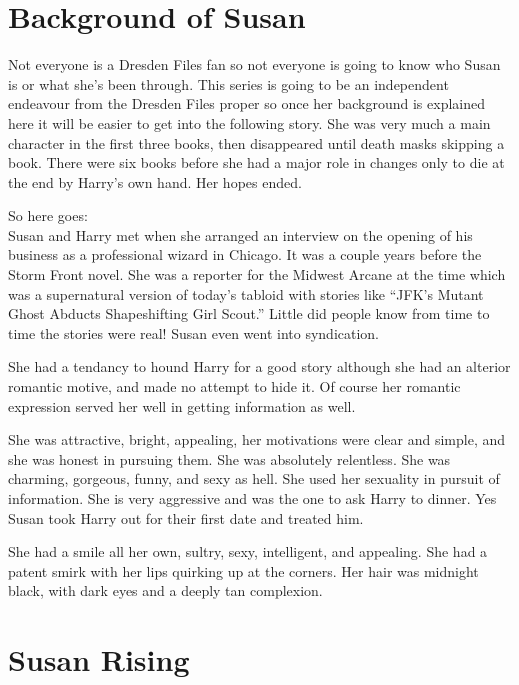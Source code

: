 \documentclass[12pt,twoside,onecolumn,openright,extrafontsizes]{memoir}
\begin{document}
\chapter*{Background of Susan}
{Not everyone is a Dresden Files fan so not everyone is going to know who Susan is or what she's been through. This series is going to be an independent endeavour from the Dresden Files proper so once her background is explained here it will be easier to get into the following story. She was very much a main character in the first three books, then disappeared until death masks skipping a book. There were six books before she had a major role in changes only to die at the end by Harry's own hand. Her hopes ended.

So here goes:\\
	\smallskip
Susan and Harry met when she arranged an interview on the opening of his business as a professional wizard in Chicago. It was a couple years before the Storm Front novel. She was a reporter for the Midwest Arcane at the time which was a supernatural version of today's tabloid with stories like ``JFK’s Mutant Ghost Abducts Shapeshifting Girl Scout.'' Little did people know from time to time the stories were real! Susan even went into syndication.

She had a tendancy to hound Harry for a good story although she had an alterior romantic motive, and made no attempt to hide it. Of course her romantic expression served her well in getting information as well.

She was attractive, bright, appealing, her motivations were clear and simple, and she was honest in pursuing them. She was absolutely relentless. She was charming, gorgeous, funny, and sexy as hell. She used her sexuality in pursuit of information. She is very aggressive and was the one to ask Harry to dinner. Yes Susan took Harry out for their first date and treated him. 

She had a smile all her own, sultry, sexy, intelligent, and appealing. She had a patent smirk with her lips quirking up at the corners. Her hair was midnight black, with dark eyes and a deeply tan complexion.




	
}
		
\clearpage
\tableofcontents*

\mainmatter
\chapter{Susan Rising}

\end{document}
